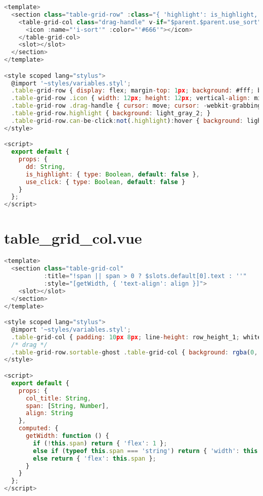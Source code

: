 \begin{lstlisting}[language=JavaScript]
<template>
  <section class="table-grid-row" :class="{ 'highlight': is_highlight, 'can-be-click': use_click }">
    <table-grid-col class="drag-handle" v-if="$parent.$parent.use_sort" :span="'35px'">
      <icon :name="'i-sort'" :color="'#666'"></icon>
    </table-grid-col>
    <slot></slot>
  </section>
</template>

<style scoped lang="stylus">
  @import '~styles/variables.styl';
  .table-grid-row { display: flex; margin-top: 1px; background: #fff; box-shadow: 0 1px 2px -1px rgba(0, 0, 0, .1); transition: all .2s; }
  .table-grid-row .icon { width: 12px; height: 12px; vertical-align: middle; }
  .table-grid-row .drag-handle { cursor: move; cursor: -webkit-grabbing; text-align: center; }
  .table-grid-row.highlight { background: light_gray_2; }
  .table-grid-row.can-be-click:not(.highlight):hover { background: light_gray_3; cursor: pointer; }
</style>

<script>
  export default {
    props: {
      dd: String,
      is_highlight: { type: Boolean, default: false },
      use_click: { type: Boolean, default: false }
    }
  };
</script>

\end{lstlisting}

\section{table\_grid\_col.vue}

\begin{lstlisting}[language=JavaScript]
<template>
  <section class="table-grid-col"
           :title="!span || span > 0 ? $slots.default[0].text : ''"
           :style="[getWidth, { 'text-align': align }]">
    <slot></slot>
  </section>
</template>

<style scoped lang="stylus">
  @import '~styles/variables.styl';
  .table-grid-col { padding: 10px 8px; line-height: row_height_1; white-space: nowrap; overflow: hidden; text-overflow: ellipsis; }
  /* drag */
  .table-grid-row.sortable-ghost .table-grid-col { background: rgba(0, 0, 0, .02); }
</style>

<script>
  export default {
    props: {
      col_title: String,
      span: [String, Number],
      align: String
    },
    computed: {
      getWidth: function () {
        if (!this.span) return { 'flex': 1 };
        else if (typeof this.span === 'string') return { 'width': this.span };
        else return { 'flex': this.span };
      }
    }
  };
</script>

\end{lstlisting}

